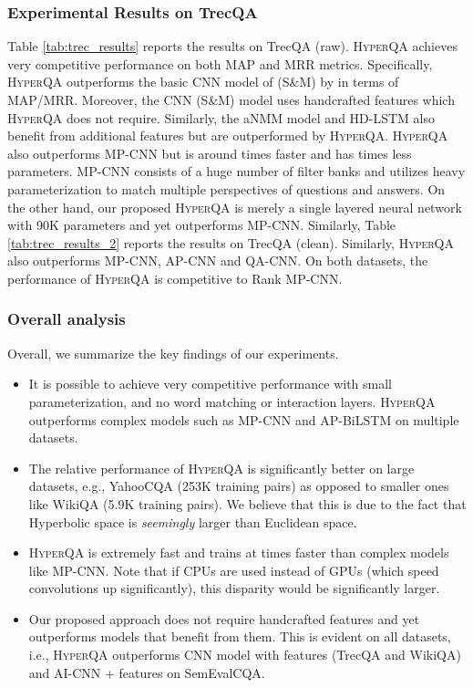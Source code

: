 \documentclass[sigconf]{acmart}
\begin{document}
\subsubsection{Experimental Results on TrecQA}
Table \ref{tab:trec_results} reports the results on TrecQA (raw). \textsc{HyperQA} achieves very competitive performance on both MAP and MRR metrics. Specifically, \textsc{HyperQA} outperforms the basic CNN model of (S\&M) by   in terms of MAP/MRR. Moreover, the CNN (S\&M) model uses handcrafted features which \textsc{HyperQA} does not require. Similarly, the aNMM model and HD-LSTM also benefit from additional features but are outperformed by \textsc{HyperQA}. \textsc{HyperQA} also outperforms MP-CNN but is around  times faster and has  times less parameters. MP-CNN consists of a huge number of filter banks and utilizes heavy parameterization to match multiple perspectives of questions and answers. On the other hand, our proposed \textsc{HyperQA} is merely a single layered neural network with 90K parameters and yet outperforms MP-CNN. Similarly, Table \ref{tab:trec_results_2} reports the results on TrecQA (clean). Similarly, \textsc{HyperQA} also outperforms MP-CNN, AP-CNN and QA-CNN. On both datasets, the performance of \textsc{HyperQA} is competitive to Rank MP-CNN. 



\subsubsection{Overall analysis}
Overall, we summarize the key findings of our experiments.
\begin{itemize}
\item It is possible to achieve very competitive performance with small parameterization, and no word matching or interaction layers. \textsc{HyperQA} outperforms complex models such as MP-CNN and AP-BiLSTM on multiple datasets. 
\item The relative performance of \textsc{HyperQA} is significantly better on large datasets, e.g., YahooCQA (253K training pairs) as opposed to smaller ones like WikiQA (5.9K training pairs). We believe that this is due to the fact that Hyperbolic space is \textit{seemingly} larger than Euclidean space. 
\item \textsc{HyperQA} is extremely fast and trains at  times faster than complex models like MP-CNN. Note that if CPUs are used instead of GPUs (which speed convolutions up significantly), this disparity would be significantly larger. 
\item Our proposed approach does not require handcrafted features and yet outperforms models that benefit from them. This is evident on all datasets, i.e., \textsc{HyperQA} outperforms CNN model with features (TrecQA and WikiQA) and AI-CNN + features on SemEvalCQA. 
\end{itemize}
\end{document}
